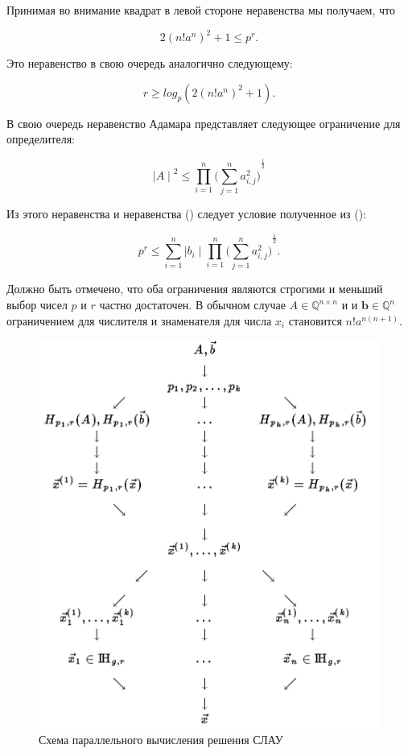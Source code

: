 \documentclass[master, och, diploma, times]{sty/SCWorks}
\theoremstyle{plain}
\theoremstyle{definition}
\begin{document}
Принимая во внимание квадрат в левой стороне неравенства мы получаем, что 

$$
2{(n!a^n)}^2+1\leq p^r.
$$ 

\noindent Это неравенство в свою очередь аналогично следующему:

$$
r \geq log_p(2{(n!a^n)}^2+1).
$$

В свою очередь неравенство Адамара представляет следующее ограничение для определителя:

$$
{\mid A \mid}^2 \leq \prod\limits_{i=1}^{n}{\bigg(\sum\limits_{j=1}^{n} a^2_{i,j} \bigg)}^{\frac{1}{2}}
$$

Из этого неравенства и неравенства () следует условие полученное из ():

$$
p^r \leq \sum\limits_{i=1}^{n} {\mid b_i \mid} \prod\limits_{i=1}^{n}{\bigg(\sum\limits_{j=1}^{n} a^2_{i,j} \bigg)}^{\frac{1}{2}}.
$$

Должно быть отмечено, что оба ограничения являются строгими и меньший выбор чисел $p$ и $r$ частно достаточен. В обычном случае $A \in \mathbb{Q}^{n \times n}$ и и $\boldsymbol{b} \in \mathbb{Q}^{n}$ ограничением для числителя и знаменателя для числа $x_i$ становится $n!a^{n(n+1)}$. 

\begin{figure}[H]
\centerline{\includegraphics[width=0.7\linewidth]{images/multi/native.png}}
\caption{Схема параллельного вычисления решения СЛАУ}
\label{img:multi:algo}
\end{figure}
\end{document}
